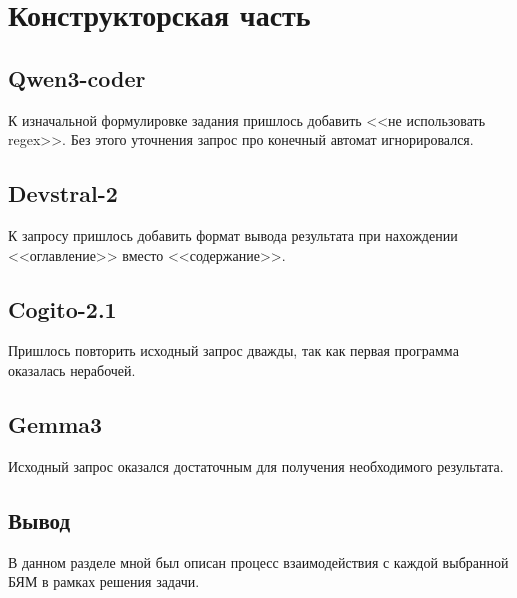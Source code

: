 \chapter{Конструкторская часть}

\section{Qwen3-coder}

К изначальной формулировке задания пришлось добавить <<не использовать regex>>. Без этого уточнения запрос про конечный автомат игнорировался.

\section{Devstral-2}

К запросу пришлось добавить формат вывода результата при нахождении <<оглавление>> вместо <<содержание>>.

\section{Cogito-2.1}

Пришлось повторить исходный запрос дважды, так как первая программа оказалась нерабочей.

\section{Gemma3}

Исходный запрос оказался достаточным для получения необходимого результата.

\section*{Вывод}

В данном разделе мной был описан процесс взаимодействия с каждой выбранной БЯМ в рамках решения задачи.

\clearpage
